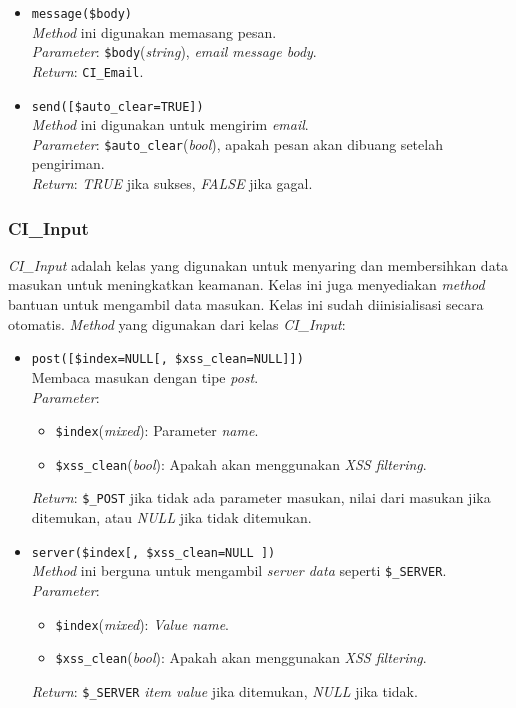 \begin{itemize}
	\item \texttt{message(\$body)} \\
	\textit{Method} ini digunakan memasang pesan. \\
	\textit{Parameter}: \texttt{\$body}(\textit{string}), \textit{email message body}. \\
	\textit{Return}: \texttt{CI\_Email}.
	
	\item \texttt{send([\$auto\_clear=TRUE])} \\
	\textit{Method} ini digunakan untuk mengirim \textit{email}. \\
	\textit{Parameter}: \texttt{\$auto\_clear}(\textit{bool}), apakah pesan akan dibuang setelah pengiriman. \\
	\textit{Return}: \textit{TRUE} jika sukses, \textit{FALSE} jika gagal.
	
	
\end{itemize}

\subsubsection{CI\_Input}
\textit{CI\_Input} adalah kelas yang digunakan untuk menyaring dan membersihkan data masukan untuk meningkatkan keamanan. Kelas ini juga menyediakan \textit{method} bantuan untuk mengambil data masukan. Kelas ini sudah diinisialisasi secara otomatis. \textit{Method} yang digunakan dari kelas \textit{CI\_Input}:
\begin{itemize}
	\item \texttt{post([\$index=NULL[, \$xss\_clean=NULL]])} \\
	Membaca masukan dengan tipe \textit{post}. \\
	\textit{Parameter}:
	\begin{itemize}
		\item \texttt{\$index}(\textit{mixed}): Parameter \textit{name}.
		\item \texttt{\$xss\_clean}(\textit{bool}): Apakah akan menggunakan \textit{XSS filtering}.
	\end{itemize}
	\textit{Return}: \texttt{\$\_POST} jika tidak ada parameter masukan, nilai dari masukan jika ditemukan, atau \textit{NULL} jika tidak ditemukan.
	
	\item \texttt{server(\$index[, \$xss\_clean=NULL ])} \\ 
	\textit{Method} ini berguna untuk mengambil \textit{server data} seperti \texttt{\$\_SERVER}. \\
	\textit{Parameter}:
	\begin{itemize}
		\item \texttt{\$index}(\textit{mixed}): \textit{Value name}. 
		\item \texttt{\$xss\_clean}(\textit{bool}): Apakah akan menggunakan \textit{XSS filtering}.
	\end{itemize}
	\textit{Return}: \texttt{\$\_SERVER} \textit{item value} jika ditemukan, \textit{NULL} jika tidak.
	
\end{itemize}
